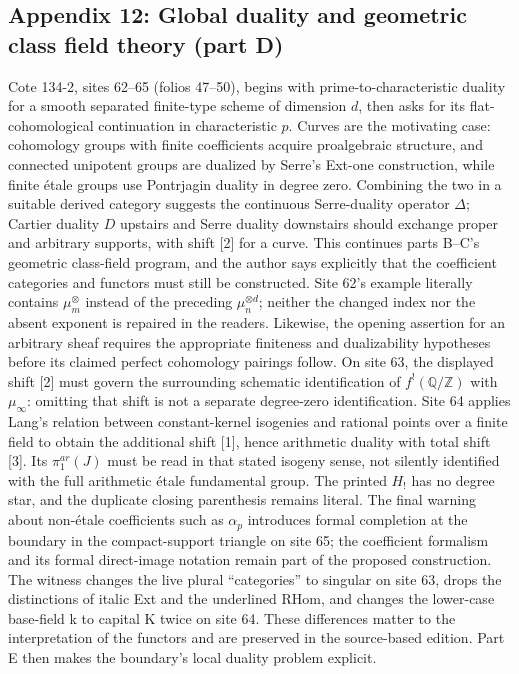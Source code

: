 \documentclass[10pt,oneside]{book}
\begin{document}
\subsection*{Appendix 12: Global duality and geometric class field theory (part D)}
Cote 134-2, sites 62--65 (folios 47--50), begins with prime-to-characteristic duality for a smooth separated finite-type scheme of dimension $d$, then asks for its flat-cohomological continuation in characteristic $p$. Curves are the motivating case: cohomology groups with finite coefficients acquire proalgebraic structure, and connected unipotent groups are dualized by Serre's Ext-one construction, while finite étale groups use Pontrjagin duality in degree zero. Combining the two in a suitable derived category suggests the continuous Serre-duality operator $\Delta$; Cartier duality $D$ upstairs and Serre duality downstairs should exchange proper and arbitrary supports, with shift [2] for a curve. This continues parts B--C's geometric class-field program, and the author says explicitly that the coefficient categories and functors must still be constructed. Site 62's example literally contains $\mu_m^{\otimes}$ instead of the preceding $\mu_n^{\otimes d}$; neither the changed index nor the absent exponent is repaired in the readers. Likewise, the opening assertion for an arbitrary sheaf requires the appropriate finiteness and dualizability hypotheses before its claimed perfect cohomology pairings follow. On site 63, the displayed shift [2] must govern the surrounding schematic identification of $f^!(\mathbb Q/\mathbb Z)$ with $\mu_\infty$: omitting that shift is not a separate degree-zero identification. Site 64 applies Lang's relation between constant-kernel isogenies and rational points over a finite field to obtain the additional shift [1], hence arithmetic duality with total shift [3]. Its $\pi_1^{ar}(J)$ must be read in that stated isogeny sense, not silently identified with the full arithmetic étale fundamental group. The printed $H_!$ has no degree star, and the duplicate closing parenthesis remains literal. The final warning about non-étale coefficients such as $\alpha_p$ introduces formal completion at the boundary in the compact-support triangle on site 65; the coefficient formalism and its formal direct-image notation remain part of the proposed construction. The witness changes the live plural ``categories'' to singular on site 63, drops the distinctions of italic Ext and the underlined RHom, and changes the lower-case base-field k to capital K twice on site 64. These differences matter to the interpretation of the functors and are preserved in the source-based edition. Part E then makes the boundary's local duality problem explicit.
\end{document}
